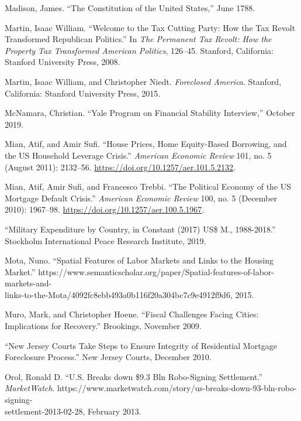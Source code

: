 \documentclass[12pt,oneside]{psthesis}
\begin{document}
\leavevmode\hypertarget{ref-madison1788constitution}{}%
Madison, James. ``The Constitution of the United States,'' June 1788.

\leavevmode\hypertarget{ref-martin2008welcome}{}%
Martin, Isaac William. ``Welcome to the Tax Cutting Party: How the Tax Revolt Transformed Republican Politics.'' In \emph{The Permanent Tax Revolt: How the Property Tax Transformed American Politics}, 126--45. Stanford, California: Stanford University Press, 2008.

\leavevmode\hypertarget{ref-martin2015foreclosed}{}%
Martin, Isaac William, and Christopher Niedt. \emph{Foreclosed America}. Stanford, California: Stanford University Press, 2015.

\leavevmode\hypertarget{ref-mcnamara2019yale}{}%
McNamara, Christian. ``Yale Program on Financial Stability Interview,'' October 2019.

\leavevmode\hypertarget{ref-mian2011house}{}%
Mian, Atif, and Amir Sufi. ``House Prices, Home Equity-Based Borrowing, and the US Household Leverage Crisis.'' \emph{American Economic Review} 101, no. 5 (August 2011): 2132--56. \url{https://doi.org/10.1257/aer.101.5.2132}.

\leavevmode\hypertarget{ref-mianPoliticalEconomyUS2010}{}%
Mian, Atif, Amir Sufi, and Francesco Trebbi. ``The Political Economy of the US Mortgage Default Crisis.'' \emph{American Economic Review} 100, no. 5 (December 2010): 1967--98. \url{https://doi.org/10.1257/aer.100.5.1967}.

\leavevmode\hypertarget{ref-2019military}{}%
``Military Expenditure by Country, in Constant (2017) US\$ M., 1988-2018.'' Stockholm International Peace Research Institute, 2019.

\leavevmode\hypertarget{ref-mota2015spatial}{}%
Mota, Nuno. ``Spatial Features of Labor Markets and Links to the Housing Market.'' https://www.semanticscholar.org/paper/Spatial-features-of-labor-markets-and-\\links-to-the-Mota/4092fc8ebb493a0b116f20a304bc7c9e4912f9d6, 2015.

\leavevmode\hypertarget{ref-muro2009fiscal}{}%
Muro, Mark, and Christopher Hoene. ``Fiscal Challenges Facing Cities: Implications for Recovery.'' Brookings, November 2009.

\leavevmode\hypertarget{ref-comfort2010new}{}%
``New Jersey Courts Take Steps to Ensure Integrity of Residential Mortgage Foreclosure Process.'' New Jersey Courts, December 2010.

\leavevmode\hypertarget{ref-orol2013breaks}{}%
Orol, Ronald D. ``U.S. Breaks down \$9.3 Bln Robo-Signing Settlement.'' \emph{MarketWatch}. https://www.marketwatch.com/story/us-breaks-down-93-bln-robo-signing-\\settlement-2013-02-28, February 2013.
\end{document}
